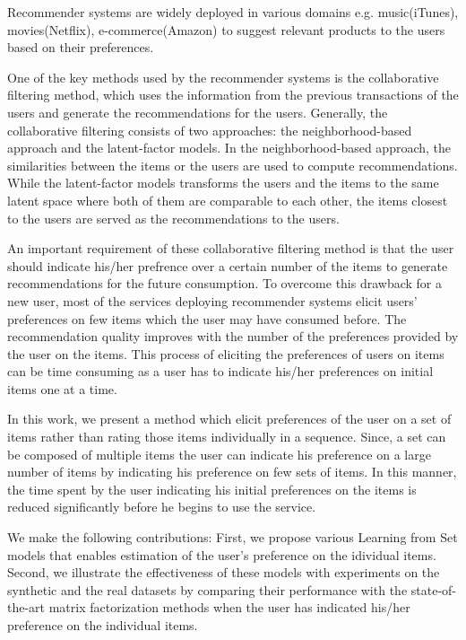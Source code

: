 


Recommender systems are widely deployed in various domains e.g. music(iTunes),
movies(Netflix), e-commerce(Amazon) to suggest relevant products to the users
based on their preferences. 

One of the key methods used by the recommender systems is the collaborative
filtering method, which uses the information from the previous transactions of the users 
and generate the recommendations for the users. Generally, the collaborative
filtering consists of two approaches: the neighborhood-based approach and the
latent-factor models. In the neighborhood-based approach, the similarities
between the items or the users are used to compute recommendations. While the
latent-factor models transforms the users and the items to the same
latent space where both of them are comparable to each other, the items closest
to the users are served as the recommendations to the users.

An important requirement of these collaborative filtering method is that the
user should indicate his/her prefrence over a certain number of the items to
generate recommendations for the future consumption. To overcome this drawback
for a new user, most of the services deploying recommender systems elicit users' preferences on
few items which the user may have consumed before. The recommendation quality
improves with the number of the preferences provided by the user on the items.
This process of eliciting the preferences of users on items can be time
consuming as a user has to indicate his/her preferences on initial items one at a time. 

In this work, we present a method which elicit preferences of the user on a set of
items rather than rating those items individually in a sequence. Since, a set
can be composed of multiple items the  user can indicate his preference on a large
number of items by indicating his preference on few sets of items. In this
manner, the time spent by the user indicating his initial preferences on the items is 
reduced significantly before he begins to use the service. 


We make the following contributions: First, we propose various Learning from Set
models that enables estimation of the user's preference on the idividual items.
Second, we illustrate the effectiveness of these models with experiments on the 
synthetic and the real datasets by comparing their performance with the state-of-the-art 
matrix factorization methods when the user has indicated his/her preference on
the individual items.










